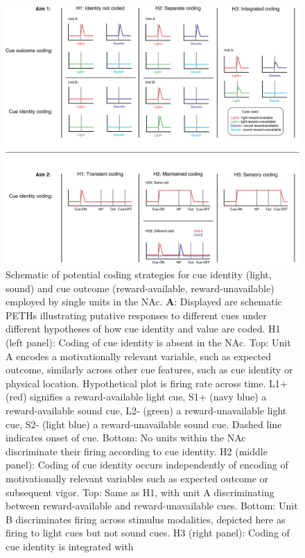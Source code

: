 \documentclass[11pt]{article}
\newcommand{\bsf}[1]{\textbf{#1}}
\begin{document}
\begin{figure}[h]
\centering
\includegraphics[height=0.5\textheight]{Fig 1 - Schematic neural.png}
\caption{Schematic of potential coding strategies for cue identity (light,
  sound) and cue outcome (reward-available, reward-unavailable) employed by
  single units in the NAc. \bsf{A}: Displayed are schematic PETHs illustrating
  putative responses to different cues under different hypotheses of how cue
  identity and value are coded. H1 (left panel): Coding of cue identity is
  absent in the NAc. Top: Unit A encodes a motivationally relevant variable,
  such as expected outcome, similarly across other cue features, such as cue
  identity or physical location. Hypothetical plot is firing rate across
  time. L1+ (red) signifies a reward-available light cue, S1+ (navy blue) a
  reward-available sound cue, L2- (green) a reward-unavailable light cue, S2-
  (light blue) a reward-unavailable sound cue. Dashed line indicates onset of
  cue. Bottom: No units within the NAc discriminate their firing according to
  cue identity. H2 (middle panel): Coding of cue identity occurs independently
  of encoding of motivationally relevant variables such as expected outcome or
  subsequent vigor. Top: Same as H1, with unit A discriminating between
  reward-available and reward-unavailable cues. Bottom: Unit B discriminates
  firing across stimulus modalities, depicted here as firing to light cues but
  not sound cues. H3 (right panel): Coding of cue identity is integrated with
}
\end{figure}
\end{document}
